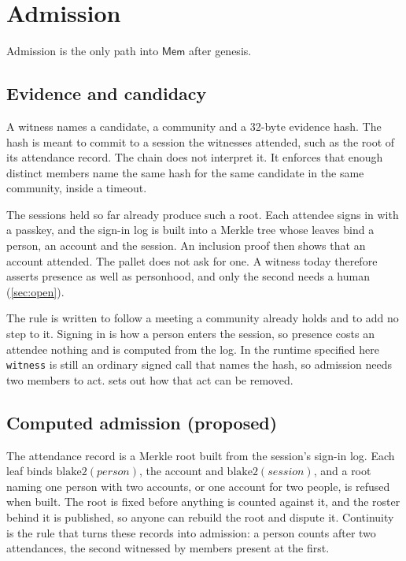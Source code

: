 \documentclass[11pt,a4paper]{article}
\theoremstyle{definition}
\theoremstyle{plain}
\theoremstyle{remark}
\newcommand{\mem}{\mathsf{Mem}}
\begin{document}
\section{Admission}
\label{sec:admission}

Admission is the only path into $\mem$ after genesis.

\subsection{Evidence and candidacy}

A witness names a candidate, a community and a 32-byte evidence hash. The hash is meant to commit to a session the witnesses attended, such as the root of its attendance record. The chain does not interpret it. It enforces that enough distinct members name the same hash for the same candidate in the same community, inside a timeout.

The sessions held so far already produce such a root. Each attendee signs in with a passkey, and the sign-in log is built into a Merkle tree whose leaves bind a person, an account and the session. An inclusion proof then shows that an account attended. The pallet does not ask for one. A witness today therefore asserts presence as well as personhood, and only the second needs a human (\cref{sec:open}).

The rule is written to follow a meeting a community already holds and to add no step to it. Signing in is how a person enters the session, so presence costs an attendee nothing and is computed from the log. In the runtime specified here \texttt{witness} is still an ordinary signed call that names the hash, so admission needs two members to act.  sets out how that act can be removed.

\subsection{Computed admission (proposed)}
\label{sec:computed}

The attendance record is a Merkle root built from the session's sign-in log. Each leaf binds $\mathrm{blake2}(\mathit{person})$, the account and $\mathrm{blake2}(\mathit{session})$, and a root naming one person with two accounts, or one account for two people, is refused when built. The root is fixed before anything is counted against it, and the roster behind it is published, so anyone can rebuild the root and dispute it. Continuity is the rule that turns these records into admission: a person counts after two attendances, the second witnessed by members present at the first.
\end{document}
